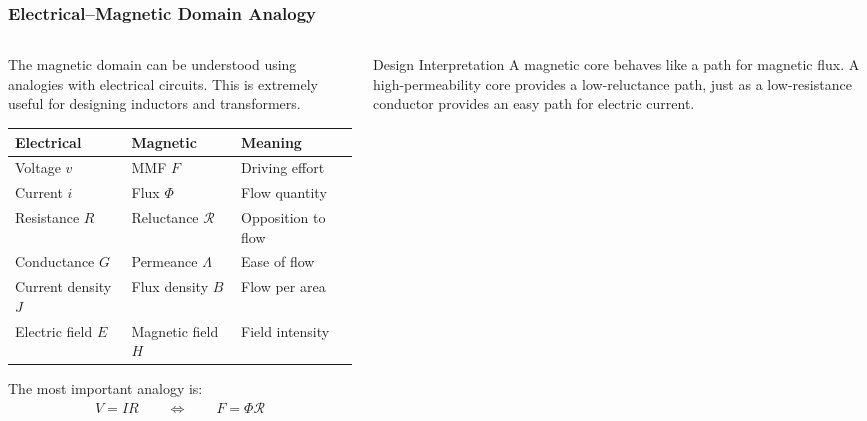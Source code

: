 \begin{frame} 
    \frametitle{Electrical--Magnetic Domain Analogy} 
    \begin{columns} 
        \begin{column}{0.56\textwidth} 
            The magnetic domain can be understood using analogies with electrical circuits. This is extremely useful for designing inductors and transformers. 
            \vspace{0.15cm} 
            \begin{table} 
                \centering 
                \small 
                \begin{tabular}{lll} 
                    \hline 
                    \textbf{Electrical} & \textbf{Magnetic} & \textbf{Meaning}\\ \hline 
                    Voltage $v$ & MMF $F$ & Driving effort\\ 
                    Current $i$ & Flux $\Phi$ & Flow quantity\\ 
                    Resistance $R$ & Reluctance $\mathcal{R}$ & Opposition to flow\\ 
                    Conductance $G$ & Permeance $\Lambda$ & Ease of flow\\ 
                    Current density $J$ & Flux density $B$ & Flow per area\\ 
                    Electric field $E$ & Magnetic field $H$ & Field intensity\\ 
                    \hline 
                \end{tabular} 
            \end{table} 
            \vspace{0.15cm} 
            The most important analogy is: 
            \begin{align} 
                V=IR \qquad \Longleftrightarrow \qquad F=\Phi\mathcal{R} 
            \end{align} 
        \end{column} 
        \begin{column}{0.40\textwidth} 
            \begin{block}{Design Interpretation} 
                \small A magnetic core behaves like a path for magnetic flux. A high-permeability core provides a low-reluctance path, just as a low-resistance conductor provides an easy path for electric current. 

\end{block}
\end{column}
\end{columns}
\end{frame}
